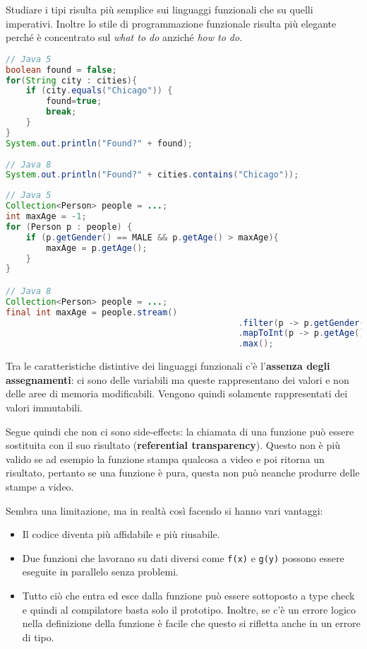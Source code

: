 Studiare i tipi risulta più semplice sui linguaggi funzionali che su quelli imperativi.
Inoltre lo stile di programmazione funzionale risulta più elegante perché è concentrato sul \textit{what to do} anziché \textit{how to do}.

\begin{lstlisting}[language=Java, caption=Confronto tra Java5 e Java8: nel secondo caso è subito chiaro l'intento del programmatore in oltre non vengono aggiunte variabili mutable. Tuttavia l'esempio non usa le caratteristiche funzionali di Java8]
// Java 5
boolean found = false;
for(String city : cities){
	if (city.equals("Chicago")) {
		found=true;
		break;
	}
}
System.out.println("Found?" + found);
	
// Java 8
System.out.println("Found?" + cities.contains("Chicago"));
\end{lstlisting}

\begin{lstlisting}[language = Java, caption=Confronto tra Java 5 e Java 8: l'utlilizzo delle funzioni lambda rende il codice più conciso. Inoltre non vengono usate variabili mutabili e il codice è facilmente parallelizzabile.]
// Java 5
Collection<Person> people = ...;
int maxAge = -1;
for (Person p : people) {
	if (p.getGender() == MALE && p.getAge() > maxAge){
		maxAge = p.getAge();
	}
}

// Java 8
Collection<Person> people = ...;
final int maxAge = people.stream()
										      .filter(p -> p.getGender() == MALE)
										      .mapToInt(p -> p.getAge())
										      .max();
\end{lstlisting}

Tra le caratteristiche distintive dei linguaggi funzionali c'è l'\textbf{assenza degli assegnamenti}: ci sono delle variabili ma queste rappresentano dei valori e non delle aree di memoria modificabili. Vengono quindi solamente rappresentati dei valori immutabili.

Segue quindi che non ci sono side-effects: la chiamata di una funzione può essere sostituita con il suo risultato (\textbf{referential transparency}). Questo non è più valido se ad esempio la funzione stampa qualcosa a video e poi ritorna un risultato, pertanto se una funzione è pura, questa non può neanche produrre delle stampe a video.

Sembra una limitazione, ma in realtà così facendo si hanno vari vantaggi:
\begin{itemize}
	\item Il codice diventa più affidabile e più riusabile.
	\item Due funzioni che lavorano su dati diversi come \texttt{f(x)} e \texttt{g(y)} possono essere eseguite in parallelo senza problemi.
	\item Tutto ciò che entra ed esce dalla funzione può essere sottoposto a type check e quindi al compilatore basta solo il prototipo. Inoltre, se c'è un errore logico nella definizione della funzione è facile che questo si rifletta anche in un errore di tipo.
\end{itemize}

